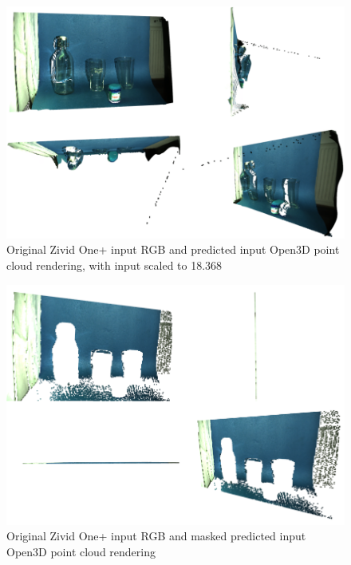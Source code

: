 \begin{figure}[h!]
\centering
\includegraphics[width=\textwidth]{Figures/20210627173322_Zivid_output.png}
\caption{Original Zivid One+ input RGB and predicted input Open3D point cloud rendering, with input scaled to 18.368}
\label{fig:20210627173322_Zivid_output}
\end{figure}

\begin{figure}[h!]
\centering
\includegraphics[width=\textwidth]{Figures/20210627173322_Zivid_dp_output.png}
\caption{Original Zivid One+ input RGB and masked predicted input Open3D point cloud rendering}
\label{fig:20210627173322_Zivid_dp_output}
\end{figure}




